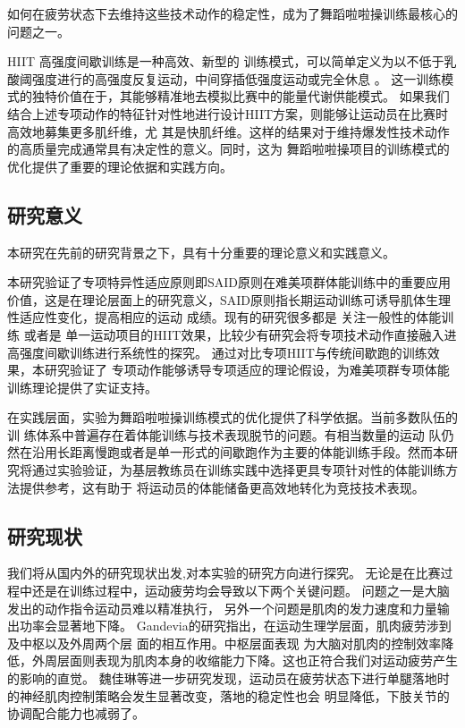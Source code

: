 \documentclass[a4paper,12pt]{article}
\begin{document}
如何在疲劳状态下去维持这些技术动作的稳定性，成为了舞蹈啦啦操训练最核心的问题之一。

HIIT 高强度间歇训练是一种高效、新型的
训练模式，可以简单定义为以不低于乳酸阈强度进行的高强度反复运动，中间穿插低强度运动或完全休息 \cite{zhangrenjie2021}。
这一训练模式的独特价值在于，其能够精准地去模拟比赛中的能量代谢供能模式。
如果我们结合上述专项动作的特征针对性地进行设计HIIT方案，则能够让运动员在比赛时高效地募集更多肌纤维，尤
其是快肌纤维。这样的结果对于维持爆发性技术动作的高质量完成通常具有决定性的意义。同时，这为
舞蹈啦啦操项目的训练模式的优化提供了重要的理论依据和实践方向。

\subsection{研究意义}

本研究在先前的研究背景之下，具有十分重要的理论意义和实践意义。

本研究验证了专项特异性适应原则即SAID原则在难美项群体能训练中的重要应用价值，这是在理论层面上的研究意义，SAID原则指长期运动训练可诱导肌体生理性适应性变化，提高相应的运动 成绩\cite{majizheng2009}。现有的研究很多都是
关注一般性的体能训练 或者是 单一运动项目的HIIT效果，比较少有研究会将专项技术动作直接融入进高强度间歇训练进行系统性的探究。
通过对比专项HIIT与传统间歇跑的训练效果，本研究验证了
专项动作能够诱导专项适应的理论假设，为难美项群专项体能训练理论提供了实证支持。

在实践层面，实验为舞蹈啦啦操训练模式的优化提供了科学依据。当前多数队伍的训
练体系中普遍存在着体能训练与技术表现脱节的问题。有相当数量的运动
队仍然在沿用长距离慢跑或者是单一形式的间歇跑作为主要的体能训练手段。然而本研
究将通过实验验证，为基层教练员在训练实践中选择更具专项针对性的体能训练方法提供参考，这有助于
将运动员的体能储备更高效地转化为竞技技术表现。


\subsection{研究现状}

我们将从国内外的研究现状出发,对本实验的研究方向进行探究。
无论是在比赛过程中还是在训练过程中，运动疲劳均会导致以下两个关键问题。
问题之一是大脑发出的动作指令运动员难以精准执行，
另外一个问题是肌肉的发力速度和力量输出功率会显著地下降。
Gandevia的研究指出，在运动生理学层面，肌肉疲劳涉到及中枢以及外周两个层
面的相互作用\cite{gandevia2001}。中枢层面表现
为大脑对肌肉的控制效率降低，外周层面则表现为肌肉本身的收缩能力下降。这也正符合我们对运动疲劳产生的影响的直觉。
魏佳琳等进一步研究发现，运动员在疲劳状态下进行单腿落地时的神经肌肉控制策略会发生显著改变，落地的稳定性也会
明显降低，下肢关节的协调配合能力也减弱了\cite{weijialin2023}。
\end{document}

